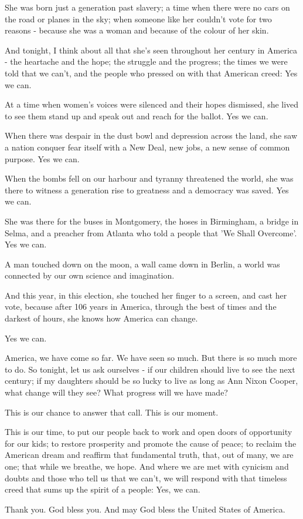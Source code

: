 \documentclass[12pt,a4paper,twocolumn]{article}
\begin{document}
She was born just a generation past slavery; a time when there were no cars on the road or planes in the sky; when someone
like her couldn't vote for two reasons - because she was a woman and because of the colour of her skin.

And tonight, I think about all that she's seen throughout her century in America - the heartache and the hope; the struggle
and the progress; the times we were told that we can't, and the people who pressed on with that American creed: Yes we can.

At a time when women's voices were silenced and their hopes dismissed, she lived to see them stand up and speak out and
reach for the ballot. Yes we can.

When there was despair in the dust bowl and depression across the land, she saw a nation conquer fear itself with a New
Deal, new jobs, a new sense of common purpose. Yes we can.

When the bombs fell on our harbour and tyranny threatened the world, she was there to witness a generation rise to greatness
and a democracy was saved. Yes we can.

She was there for the buses in Montgomery, the hoses in Birmingham, a bridge in Selma, and a preacher from Atlanta who told
a people that 'We Shall Overcome'. Yes we can.

A man touched down on the moon, a wall came down in Berlin, a world was connected by our own science and imagination.

And this year, in this election, she touched her finger to a screen, and cast her vote, because after 106 years in America,
through the best of times and the darkest of hours, she knows how America can change.

Yes we can.

America, we have come so far. We have seen so much. But there is so much more to do. So tonight, let us ask ourselves - if
our children should live to see the next century; if my daughters should be so lucky to live as long as Ann Nixon Cooper,
what change will they see? What progress will we have made?

This is our chance to answer that call. This is our moment.

This is our time, to put our people back to work and open doors of opportunity for our kids; to restore prosperity and
promote the cause of peace; to reclaim the American dream and reaffirm that fundamental truth, that, out of many, we are
one; that while we breathe, we hope. And where we are met with cynicism and doubts and those who tell us that we can't, we
will respond with that timeless creed that sums up the spirit of a people: Yes, we can.

Thank you. God bless you. And may God bless the United States of America.
\end{document}
